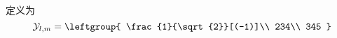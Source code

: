 

定义为
\begin{equation}
\mathcal Y_{l,m} = \leftgroup{
\frac{1}{\sqrt{2}}[(-1)]\\
234\\
345
}\end{equation}
